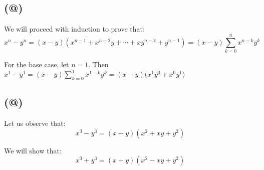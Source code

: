 \documentclass{article}
\makeatletter
\newcommand*{\rom}[1]{\expandafter\@slowromancap\romannumeral #1@}
\makeatother
\begin{document}
\subsection*{(\rom{5})}
We will proceed with induction to prove that:
\begin{equation*}
	x^{n} - y^{n} = (x-y)(x^{n-1} + x^{n-2}y + \cdots + xy^{n-2} + y^{n-1}) = (x-y)\sum_{k=0}^{n}x^{n-k}y^{k}
\end{equation*}

For the base case, let \(n=1\). Then \(x^{1} - y^{1} = (x-y)\sum_{k=0}^{1}x^{1-k}y^{k} = (x-y)\Big(x^{1}y^{0} + x^{0}y^{1}\Big)\)

\subsection*{(\rom{6})}

Let us observe that:
\begin{equation*}
	x^{3} - y^{3} = (x - y)(x^{2} + xy + y^{2})
\end{equation*}

We will show that:
\begin{equation*}
	x^{3} + y^{3} = (x+y)(x^{2} - xy + y^{2})
\end{equation*}
\end{document}
